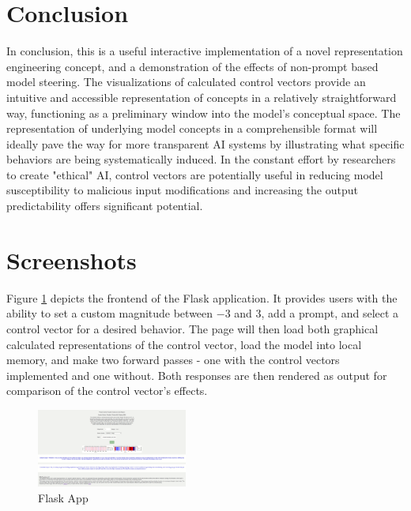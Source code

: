 \documentclass[11pt,a4paper]{article}
\begin{document}
\section{Conclusion}
In conclusion, this is a useful interactive implementation of a novel representation engineering concept, and a demonstration of the effects of non-prompt based model steering. The visualizations of calculated control vectors provide an intuitive and accessible representation of concepts in a relatively straightforward way, functioning as a preliminary window into the model's conceptual space. The representation of underlying model concepts in a comprehensible format will ideally pave the way for more transparent AI systems by illustrating what specific behaviors are being systematically induced. In the constant effort by researchers to create "ethical" AI, control vectors are potentially useful in reducing model susceptibility to malicious input modifications and increasing the output predictability offers significant potential. 






\appendix

\section{Screenshots}\label{appendix:A}

Figure \ref{fig:demo} depicts the frontend of the Flask application. It provides users with the ability to set a custom magnitude between $-3$ and $3$, add a prompt, and select a control vector for a desired behavior. The page will then load both graphical calculated representations of the control vector, load the model into local memory, and make two forward passes - one with the control vectors implemented and one without. Both responses are then rendered as output for comparison of the control vector's effects.

\begin{figure}[!ht]
\centering
\includegraphics[width = 0.44\textwidth]{assets/demo_screenshot.png}
\caption{Flask App}
\label{fig:demo}
\end{figure}
\end{document}

